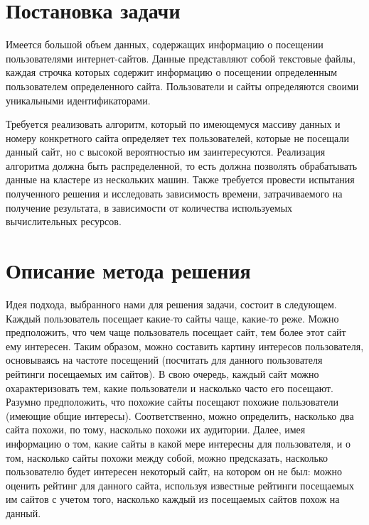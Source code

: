 \documentclass[12pt,a4paper]{report}
\begin{document}
\tableofcontents

\newpage

\section{Постановка задачи}

Имеется большой объем данных, содержащих информацию о посещении пользователями интернет-сайтов. Данные представляют собой текстовые файлы, каждая строчка которых содержит информацию о посещении определенным пользователем определенного сайта. Пользователи и сайты определяются своими уникальными идентификаторами.

Требуется реализовать алгоритм, который по имеющемуся массиву данных и номеру конкретного сайта определяет тех пользователей, которые не посещали данный сайт, но с высокой вероятностью им заинтересуются. Реализация алгоритма должна быть распределенной, то есть должна позволять обрабатывать данные на кластере из нескольких машин. Также требуется провести испытания полученного решения и исследовать зависимость времени, затрачиваемого на получение результата, в зависимости от количества используемых вычислительных ресурсов.

\section{Описание метода решения}

Идея подхода, выбранного нами для решения задачи, состоит в следующем. 
Каждый пользователь посещает какие-то сайты чаще, какие-то реже. Можно предположить, что чем чаще пользователь посещает сайт, тем более этот сайт ему интересен. Таким образом, можно составить картину интересов пользователя, основываясь на частоте посещений (посчитать для данного пользователя рейтинги посещаемых им сайтов).
В свою очередь, каждый сайт можно охарактеризовать тем, какие пользователи и насколько часто его посещают. Разумно предположить, что похожие сайты посещают похожие пользователи (имеющие общие интересы). Соответственно, можно определить, насколько два сайта похожи, по тому, насколько похожи их аудитории. Далее, имея информацию о том, какие сайты в какой мере интересны для пользователя, и о том, насколько сайты похожи между собой, можно предсказать, насколько пользователю будет интересен некоторый сайт, на котором он не был: можно оценить рейтинг для данного сайта, используя известные рейтинги посещаемых им сайтов с учетом того, насколько каждый из посещаемых сайтов похож на данный.
\end{document}
